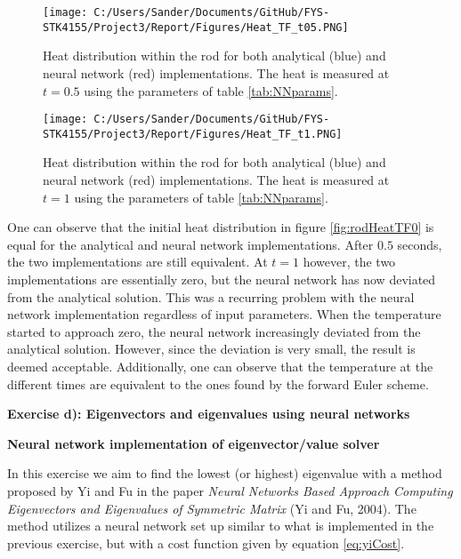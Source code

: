 \documentclass[12pt,a4paper]{article}
\begin{document}
\begin{figure}[H]
\centering
\texttt{[image: C:/Users/Sander/Documents/GitHub/FYS-STK4155/Project3/Report/Figures/Heat\_TF\_t05.PNG]}
\caption{\label{fig:rodHeatTF05} Heat distribution within the rod for both analytical (blue) and neural network (red) implementations. The heat is measured at $t = 0.5$ using the parameters of table \ref{tab:NNparams}.}
\end{figure}

\begin{figure}[H]
\centering
\texttt{[image: C:/Users/Sander/Documents/GitHub/FYS-STK4155/Project3/Report/Figures/Heat\_TF\_t1.PNG]}
\caption{\label{fig:rodHeatTF1} Heat distribution within the rod for both analytical (blue) and neural network (red) implementations. The heat is measured at $t = 1$ using the parameters of table \ref{tab:NNparams}.}
\end{figure}

\noindent One can observe that the initial heat distribution in figure \ref{fig:rodHeatTF0} is equal for the analytical and neural network implementations. After $0.5$ seconds, the two implementations are still equivalent. At $t = 1$ however, the two implementations are essentially zero, but the neural network has now deviated from the analytical solution. This was a recurring problem with the neural network implementation regardless of input parameters. When the temperature started to approach zero, the neural network increasingly deviated from the analytical solution. However, since the deviation is very small, the result is deemed acceptable. Additionally, one can observe that the temperature at the different times are equivalent to the ones found by the forward Euler scheme.

\newpage

\begin{center}
\Large{\textbf{Exercise d): Eigenvectors and eigenvalues using neural networks}}
\end{center}

\begin{center}
\large{\textbf{Neural network implementation of eigenvector/value solver}}
\end{center}

\noindent In this exercise we aim to find the lowest (or highest) eigenvalue with a method proposed by Yi and Fu in the paper \emph{Neural Networks Based Approach Computing Eigenvectors and Eigenvalues of Symmetric Matrix} (Yi and Fu, 2004). The method utilizes a neural network set up similar to what is implemented in the previous exercise, but with a cost function given by equation \ref{eq:yiCost}.
\end{document}
